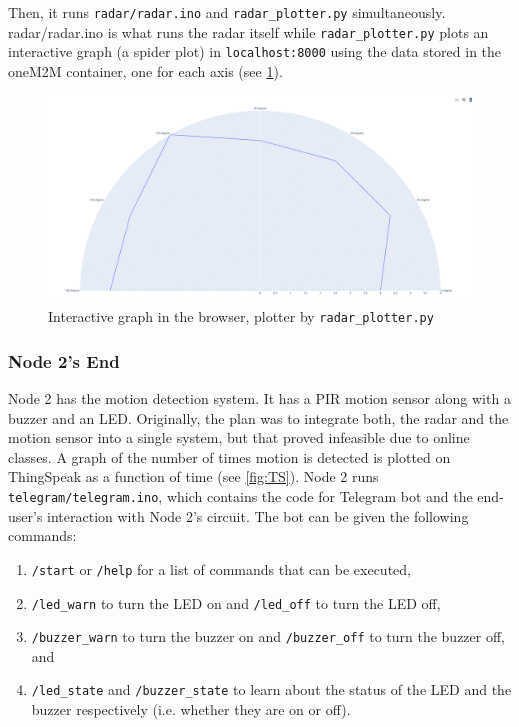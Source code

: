 \documentclass[12pt, a4paper]{article}
\theoremstyle{definition}
\theoremstyle{remark}
\begin{document}
Then, it runs \texttt{radar/radar.ino} and \texttt{radar\_plotter.py} simultaneously. \ttfamily radar/\allowbreak radar.ino \normalfont is what runs the radar itself while \texttt{radar\_plotter.py} plots an interactive graph (a spider plot) in \texttt{localhost:8000} using the data stored in the oneM2M container, one for each axis (see \cref{fig:RP}).

\begin{figure}[!h]
    \centering
    \includegraphics[scale=0.15]{img/RadarPlotter Chart.png}
    \caption{Interactive graph in the browser, plotter by \texttt{radar\_plotter.py}}
    \label{fig:RP}
\end{figure}

\subsubsection*{Node 2's End}
Node 2 has the motion detection system. It has a PIR motion sensor along with a buzzer and an LED. Originally, the plan was to integrate both, the radar and the motion sensor into a single system, but that proved infeasible due to online classes. A graph of the number of times motion is detected is plotted on ThingSpeak as a function of time (see \cref{fig:TS}). Node 2 runs \texttt{telegram/\allowbreak telegram.ino}, which contains the code for Telegram bot and the end-user's interaction with Node 2's circuit. The bot can be given the following commands:
\begin{enumerate}
    \item \texttt{/start} or \texttt{/help} for a list of commands that can be executed,
    \item \texttt{/led\_warn} to turn the LED on and \texttt{/led\_off} to turn the LED off,
    \item \texttt{/buzzer\_warn} to turn the buzzer on and \texttt{/buzzer\_off} to turn the buzzer off, and
    \item \texttt{/led\_state} and \texttt{/buzzer\_state} to learn about the status of the LED and the buzzer respectively (i.e. whether they are on or off).
\end{enumerate}
\end{document}
